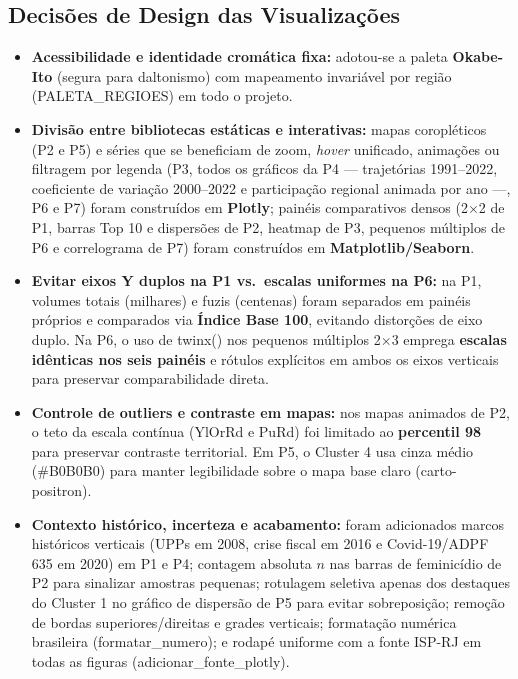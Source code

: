 \documentclass[11pt,a4paper]{article}
\newcommand{\code}[1]{{\ttfamily\footnotesize\allowbreak #1}}
\begin{document}
\subsection{Decisões de Design das Visualizações}
\begin{itemize}
  \setlength{\itemsep}{3pt}\setlength{\parskip}{0pt}
  \item \textbf{Acessibilidade e identidade cromática fixa:} adotou-se a paleta \textbf{Okabe-Ito} (segura para daltonismo) com mapeamento invariável por região (\code{PALETA\_REGIOES}) em todo o projeto.
  \item \textbf{Divisão entre bibliotecas estáticas e interativas:} mapas coropléticos (P2 e P5) e séries que se beneficiam de zoom, \textit{hover} unificado, animações ou filtragem por legenda (P3, todos os gráficos da P4 --- trajetórias 1991--2022, coeficiente de variação 2000--2022 e participação regional animada por ano ---, P6 e P7) foram construídos em \textbf{Plotly}; painéis comparativos densos (2$\times$2 de P1, barras Top 10 e dispersões de P2, heatmap de P3, pequenos múltiplos de P6 e correlograma de P7) foram construídos em \textbf{Matplotlib/Seaborn}.
  \item \textbf{Evitar eixos Y duplos na P1 vs.\ escalas uniformes na P6:} na P1, volumes totais (milhares) e fuzis (centenas) foram separados em painéis próprios e comparados via \textbf{Índice Base 100}, evitando distorções de eixo duplo. Na P6, o uso de \code{twinx()} nos pequenos múltiplos 2$\times$3 emprega \textbf{escalas idênticas nos seis painéis} e rótulos explícitos em ambos os eixos verticais para preservar comparabilidade direta.
  \item \textbf{Controle de outliers e contraste em mapas:} nos mapas animados de P2, o teto da escala contínua (\code{YlOrRd} e \code{PuRd}) foi limitado ao \textbf{percentil 98} para preservar contraste territorial. Em P5, o Cluster 4 usa cinza médio (\code{\#B0B0B0}) para manter legibilidade sobre o mapa base claro (\code{carto-positron}).
  \item \textbf{Contexto histórico, incerteza e acabamento:} foram adicionados marcos históricos verticais (UPPs em 2008, crise fiscal em 2016 e Covid-19/ADPF 635 em 2020) em P1 e P4; contagem absoluta $n$ nas barras de feminicídio de P2 para sinalizar amostras pequenas; rotulagem seletiva apenas dos destaques do Cluster 1 no gráfico de dispersão de P5 para evitar sobreposição; remoção de bordas superiores/direitas e grades verticais; formatação numérica brasileira (\code{formatar\_numero}); e rodapé uniforme com a fonte ISP-RJ em todas as figuras (\code{adicionar\_fonte\_plotly}).
\end{itemize}
\end{document}
